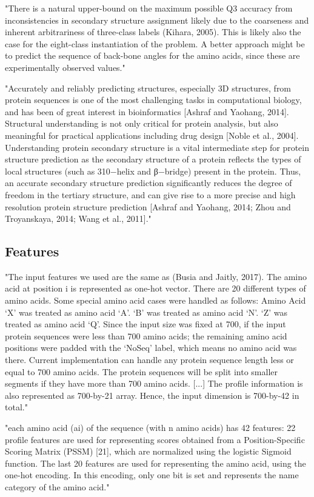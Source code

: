 "There is a natural upper-bound on the maximum possible Q3 accuracy from inconsistencies in secondary structure assignment likely due to the coarseness and inherent arbitrariness of three-class labels (Kihara, 2005). This is likely also the case for the eight-class instantiation of the problem. A better approach might be to predict the sequence of back-bone angles for the amino acids, since these are experimentally observed values." \cite{Busia2017}

"Accurately and reliably predicting structures, especially 3D structures, from protein sequences is one of the most challenging tasks in computational biology, and has been of great interest in bioinformatics [Ashraf and Yaohang, 2014]. Structural understanding is not only critical for protein analysis, but also meaningful for practical applications including drug design [Noble et al., 2004]. Understanding protein secondary structure is a vital intermediate step for protein structure prediction as the secondary structure of a protein reflects the types of local structures (such as 310−helix and β−bridge) present in the protein. Thus, an accurate secondary structure prediction significantly reduces the degree of freedom in the tertiary structure, and can give rise to a more precise and high resolution protein structure prediction [Ashraf and Yaohang, 2014; Zhou and Troyanskaya, 2014; Wang et al., 2011]." \cite{Li2016}

 \subsection{Features}
 "The input features we used are the same as (Busia and Jaitly, 2017). The amino acid at position i is represented as one-hot vector. There are 20 different types of amino acids. Some special amino acid cases were handled as follows: Amino Acid ‘X’ was treated as amino acid ‘A’. ‘B’ was treated as amino acid ‘N’. ‘Z’ was treated as amino acid ‘Q’. Since the input size was fixed at 700, if the input protein sequences were less than 700 amino acids; the remaining amino acid positions were padded with the ‘NoSeq’ label, which means no amino acid was there. Current implementation can handle any protein sequence length less or equal to 700 amino acids. The protein sequences will be split into smaller segments if they have more than 700 amino acids. [...] The profile information is also represented as 700-by-21 array. Hence, the input dimension is 700-by-42 in total." \cite{Fang2017}

 "each amino acid (ai) of the sequence (with n amino acids) has 42 features: 22 profile features are used for representing scores obtained from a Position-Specific Scoring Matrix (PSSM) [21], which are normalized using the logistic Sigmoid function. The last 20 features are used for representing the amino acid, using the one-hot encoding. In this encoding, only one bit is set and represents the name category of the amino acid." \cite{Hattori2017}

